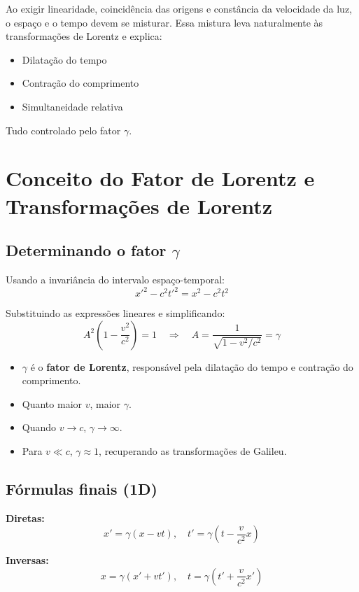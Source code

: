 \documentclass[12pt,a4paper]{article}
\begin{document}
Ao exigir linearidade, coincidência das origens e constância da velocidade da luz, o espaço e o tempo devem se misturar.  
Essa mistura leva naturalmente às transformações de Lorentz e explica:

\begin{itemize}
    \item Dilatação do tempo
    \item Contração do comprimento
    \item Simultaneidade relativa
\end{itemize}

Tudo controlado pelo fator $\gamma$.

\section{Conceito do Fator de Lorentz e Transformações de Lorentz}

\subsection{Determinando o fator $\gamma$}

Usando a invariância do intervalo espaço-temporal:
\[
x'^2 - c^2 t'^2 = x^2 - c^2 t^2
\]

Substituindo as expressões lineares e simplificando:
\[
A^2 \left(1 - \frac{v^2}{c^2}\right) = 1 \quad \Rightarrow \quad A = \frac{1}{\sqrt{1 - v^2/c^2}} = \gamma
\]

\begin{itemize}
    \item $\gamma$ é o \textbf{fator de Lorentz}, responsável pela dilatação do tempo e contração do comprimento.
    \item Quanto maior $v$, maior $\gamma$.
    \item Quando $v \to c$, $\gamma \to \infty$.
    \item Para $v \ll c$, $\gamma \approx 1$, recuperando as transformações de Galileu.
\end{itemize}

\subsection{Fórmulas finais (1D)}

\textbf{Diretas:}
\[
x' = \gamma (x - v t), \quad t' = \gamma \left(t - \frac{v}{c^2} x \right)
\]

\textbf{Inversas:}
\[
x = \gamma (x' + v t'), \quad t = \gamma \left(t' + \frac{v}{c^2} x' \right)
\]
\end{document}
